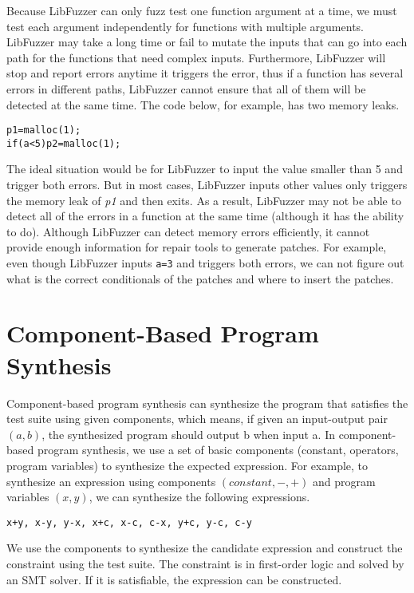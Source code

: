 \documentclass[a4paper,11pt,oneside,openany]{book}
\begin{document}
Because LibFuzzer can only fuzz test one function argument at a time, we must test each argument independently for functions with multiple arguments. LibFuzzer may take a long time or fail to mutate the inputs that can go into each path for the functions that need complex inputs. Furthermore, LibFuzzer will stop and report errors anytime it triggers the error, thus if a function has several errors in different paths, LibFuzzer cannot ensure that all of them will be detected at the same time. The code below, for example, has two memory leaks. 

\begin{minipage}{\textwidth}
    \vspace{0.2cm}
    \hspace{0.3cm}\verb|p1=malloc(1);|\\\hspace{0.3cm}\verb|if(a<5)p2=malloc(1);|\\
\end{minipage}
The ideal situation would be for LibFuzzer to input the value smaller than 5 and trigger both errors. But in most cases,  LibFuzzer inputs other values only triggers the memory leak of {\it p1} and then exits. As a result, LibFuzzer may not be able to detect all of the errors in a function at the same time (although it has the ability to do). Although LibFuzzer can detect memory errors efficiently, it cannot provide enough information for repair tools to generate patches. For example, even though LibFuzzer inputs \verb|a=3| and triggers both errors, we can not figure out what is the correct conditionals of the patches and where to insert the patches.

\section{Component-Based Program Synthesis}

Component-based program synthesis can synthesize the program that satisfies the test suite using given components, which means, if given an input-output pair$(a,b)$, the synthesized program should output b when input a. In component-based program synthesis, we use a set of basic components (constant, operators, program variables) to synthesize the expected expression. For example, to synthesize an expression using components $(constant, -, +)$ and program variables $(x, y)$, we can synthesize the following expressions. 

\begin{minipage}{\textwidth}
    \vspace{0.2cm}
    \hspace{0.3cm}\verb|x+y, x-y, y-x, x+c, x-c, c-x, y+c, y-c, c-y|\\
\end{minipage}
We use the components to synthesize the candidate expression and construct the constraint using the test suite. The constraint is in first-order logic and solved by an SMT solver. If it is satisfiable, the expression can be constructed. 
\end{document}
